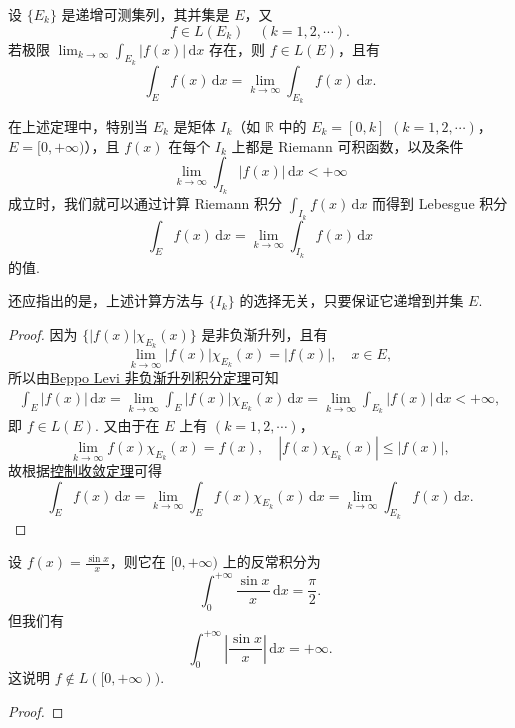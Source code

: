 \documentclass[../../main.tex]{subfiles}
\begin{document}
\begin{theorem}
设 \( \{ E_k \} \) 是递增可测集列，其并集是 \( E \)，又
\[
f \in L(E_k) \quad (k = 1, 2, \cdots).
\]
若极限 \( \lim_{k \to \infty} \int_{E_k} |f(x)| \, \mathrm{d}x \) 存在，则 \( f \in L(E) \)，且有
\[
\int_E f(x) \, \mathrm{d}x = \lim_{k \to \infty} \int_{E_k} f(x) \, \mathrm{d}x.
\]
\end{theorem}
\begin{remark}
在上述定理中，特别当 \( E_k \) 是矩体 \( I_k \)（如 \( \mathbb{R} \) 中的 \( E_k = [0, k] \) \( (k = 1, 2, \cdots) \)，\( E = [0, +\infty) \)），且 \( f(x) \) 在每个 \( I_k \) 上都是 Riemann 可积函数，以及条件
\[
\lim_{k \to \infty} \int_{I_k} |f(x)| \, \mathrm{d}x < +\infty
\]
成立时，我们就可以通过计算 Riemann 积分 \( \int_{I_k} f(x) \, \mathrm{d}x \) 而得到 Lebesgue 积分
\[
\int_E f(x) \, \mathrm{d}x = \lim_{k \to \infty} \int_{I_k} f(x) \, \mathrm{d}x
\]
的值.

还应指出的是，上述计算方法与 \( \{ I_k \} \) 的选择无关，只要保证它递增到并集 \( E \).
\end{remark}
\begin{proof}
因为 \( \{ |f(x)| \chi_{E_k}(x) \} \) 是非负渐升列，且有
\[
\lim_{k \to \infty} |f(x)| \chi_{E_k}(x) = |f(x)|, \quad x \in E,
\]
所以由\hyperref[theorem:Beppo Levi非负渐升列积分定理]{Beppo Levi 非负渐升列积分定理}可知
\begin{align*}
\int_E |f(x)| \, \mathrm{d}x = \lim_{k \to \infty} \int_E |f(x)| \chi_{E_k}(x) \, \mathrm{d}x = \lim_{k \to \infty} \int_{E_k} |f(x)| \, \mathrm{d}x < +\infty,
\end{align*}
即 \( f \in L(E) \). 又由于在 \( E \) 上有 \( (k = 1, 2, \cdots) \)，
\[
\lim_{k \to \infty} f(x) \chi_{E_k}(x) = f(x), \quad |f(x) \chi_{E_k}(x)| \leqslant |f(x)|,
\]
故根据\hyperref[theorem:控制收敛定理]{控制收敛定理}可得
\[
\int_E{f(x)\,\mathrm{d}x}=\lim_{k\rightarrow \infty} \int_E{f(x)\chi _{E_k}\left( x \right) \,\mathrm{d}x}=\lim_{k\rightarrow \infty} \int_{E_k}{f(x)\,\mathrm{d}x}.
\]
\end{proof}

\begin{example}
设 \( f(x) = \frac{\sin x}{x} \)，则它在 \( [0, +\infty) \) 上的反常积分为
\[
\int_0^{+\infty} \frac{\sin x}{x} \, \mathrm{d}x = \frac{\pi}{2}.
\]
但我们有
\[
\int_0^{+\infty} \left| \frac{\sin x}{x} \right| \, \mathrm{d}x = +\infty.
\]
这说明 \( f \notin L([0, +\infty)) \).
\end{example}
\begin{proof}

\end{proof}
\end{document}
